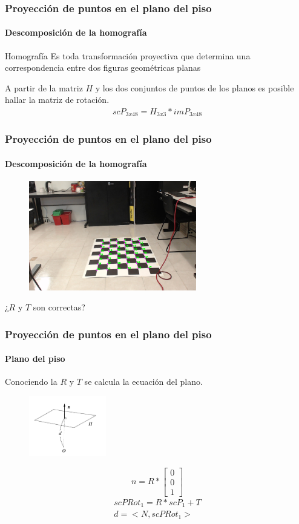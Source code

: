 \documentclass[10pt, compress]{beamer}
\begin{document}
\begin{frame}[fragile]
	\frametitle{Proyección de puntos en el plano del piso}
	\framesubtitle{Descomposición de la homografía}
	\begin{block}{Homografía}
	Es toda transformación proyectiva que determina una correspondencia entre dos figuras geométricas planas
	\end{block}
	A partir de la matriz $H$ y los dos conjuntos de puntos de los planos es posible hallar la matriz de rotación.
	\begin{eqnarray}
	scP_{3x48}=H_{3x3}*imP_{3x48}
	\end{eqnarray}
	
\end{frame}

\begin{frame}[fragile]
	\frametitle{Proyección de puntos en el plano del piso}
	\framesubtitle{Descomposición de la homografía}
	\begin{figure}[htbp]
		\includegraphics[width=0.65\textwidth]{./pictures/ajedrez}
	\end{figure}
	¿$R$ y $T$ son correctas?
			
\end{frame}

\begin{frame}[fragile]
	\frametitle{Proyección de puntos en el plano del piso}
	\framesubtitle{Plano del piso}
	Conociendo la $R$ y $T$ se calcula la ecuación del plano.
	\begin{figure}[htbp]
		\includegraphics[width=0.3\textwidth]{./pictures/plane}
	\end{figure}
		 \[n=R*\begin{bmatrix}
		 0\\
		 0\\
		 1	
		 \end{bmatrix}\]
		 		\begin{eqnarray}
		 		scPRot_1=R*scP_1+T\\
		 		d=<N,scPRot_1>
		 		\end{eqnarray}
\end{frame}
\end{document}
